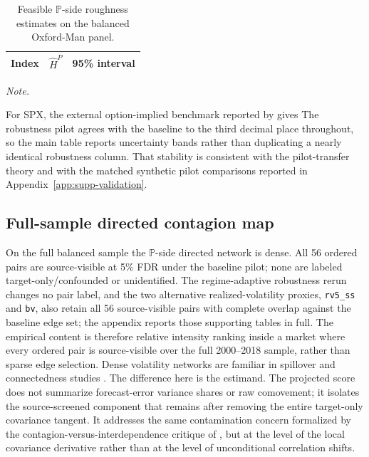\documentclass[11pt,a4paper]{amsart}
\theoremstyle{plain}
\theoremstyle{definition}
\theoremstyle{remark}
\newcommand{\PP}{\mathbb{P}}
\begin{document}
\begin{table}[htbp]
\centering
\caption{Feasible \(\PP\)-side roughness estimates on the balanced Oxford-Man panel.}
\label{tab:oxfordman-roughness}
\small
\begin{tabular}{lcc}
\toprule
Index & \(\widehat H^{P}\) & 95\% interval \\
\midrule

\end{tabular}
\end{table}

{\footnotesize\emph{Note.} }

For SPX, the external option-implied benchmark reported by \cite{livieri2018rough} gives
  The robustness pilot agrees with the
baseline to the third decimal place throughout, so the main table reports uncertainty bands rather
than duplicating a nearly identical robustness column.  That stability is consistent with the
pilot-transfer theory and with the matched synthetic pilot comparisons reported in
Appendix~\ref{app:supp-validation}.

\subsection{Full-sample directed contagion map}

On the full balanced sample the \(\PP\)-side directed network is dense.  All 56 ordered pairs are
source-visible at 5\% FDR under the baseline pilot; none are labeled target-only/confounded or
unidentified.  The regime-adaptive robustness rerun changes no pair label, and the two alternative
realized-volatility proxies, \texttt{rv5\_ss} and \texttt{bv}, also retain all 56 source-visible
pairs with complete overlap against the baseline edge set; the appendix reports those supporting
tables in full.  The empirical content is therefore relative intensity ranking inside a market where
every ordered pair is source-visible over the full 2000--2018 sample, rather than sparse edge
selection.
Dense volatility networks are familiar in spillover and connectedness studies
\cite{diebold2009spillovers,diebold2012better,diebold2014connectedness,barunik2018frequency}.  The
difference here is the estimand.  The projected score does not summarize forecast-error variance
shares or raw comovement; it isolates the source-screened component that remains after removing the
entire target-only covariance tangent.  It addresses the same contamination concern formalized by
the contagion-versus-interdependence critique of \cite{forbes2002interdependence}, but at the level
of the local covariance derivative rather than at the level of unconditional correlation shifts.
\end{document}
